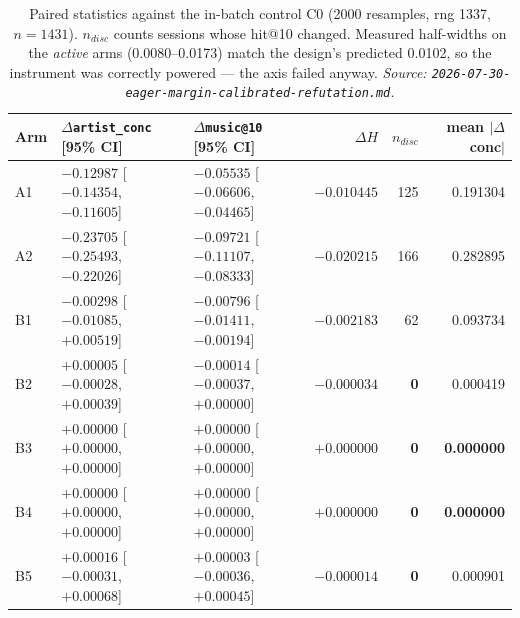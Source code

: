 \documentclass[11pt]{article}
\newcommand{\best}[1]{\textbf{#1}}
\begin{document}
\begin{table}[ht]
  \centering
  \caption{Paired statistics against the in-batch control C0 (\num{2000}
  resamples, rng \num{1337}, $n=\num{1431}$). $n_{disc}$ counts sessions whose
  hit@10 changed. Measured half-widths on the \emph{active} arms
  (\numrange{0.0080}{0.0173}) match the design's predicted \num{0.0102}, so the
  instrument was correctly powered --- the axis failed anyway.
  \emph{Source: \texttt{2026-07-30-eager-margin-calibrated-refutation.md}.}}
  \label{tab:nexttrack-eagermargin-paired}
  {\footnotesize\setlength{\tabcolsep}{4.5pt}\begin{tabular}{lllrrr}
    \toprule
    Arm & $\Delta$\texttt{artist\_conc} [95\% CI] & $\Delta$\texttt{music@10} [95\% CI] & $\Delta H$ & $n_{disc}$ & mean $|\Delta$conc$|$ \\
    \midrule
    A1 & $-0.12987$ [$-0.14354$, $-0.11605$] & $-0.05535$ [$-0.06606$, $-0.04465$] & $-0.010445$ & 125 & 0.191304 \\
    A2 & $-0.23705$ [$-0.25493$, $-0.22026$] & $-0.09721$ [$-0.11107$, $-0.08333$] & $-0.020215$ & 166 & 0.282895 \\
    B1 & $-0.00298$ [$-0.01085$, $+0.00519$] & $-0.00796$ [$-0.01411$, $-0.00194$] & $-0.002183$ & 62 & 0.093734 \\
    B2 & $+0.00005$ [$-0.00028$, $+0.00039$] & $-0.00014$ [$-0.00037$, $+0.00000$] & $-0.000034$ & \best{0} & 0.000419 \\
    B3 & $+0.00000$ [$+0.00000$, $+0.00000$] & $+0.00000$ [$+0.00000$, $+0.00000$] & $+0.000000$ & \best{0} & \best{0.000000} \\
    B4 & $+0.00000$ [$+0.00000$, $+0.00000$] & $+0.00000$ [$+0.00000$, $+0.00000$] & $+0.000000$ & \best{0} & \best{0.000000} \\
    B5 & $+0.00016$ [$-0.00031$, $+0.00068$] & $+0.00003$ [$-0.00036$, $+0.00045$] & $-0.000014$ & \best{0} & 0.000901 \\
    \bottomrule
  \end{tabular}}
\end{table}
\end{document}
